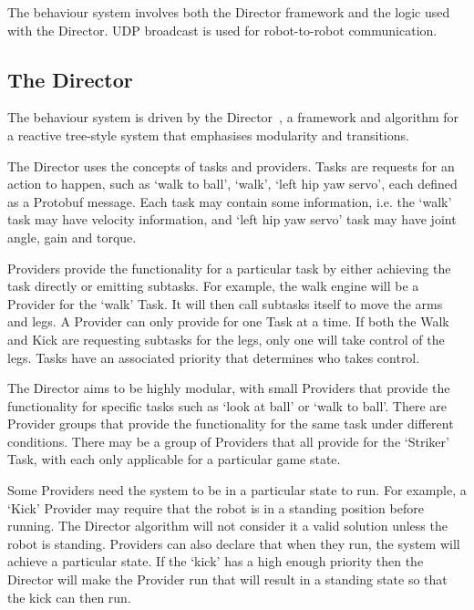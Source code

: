 \documentclass{llncs}
\begin{document}

The behaviour system involves both the Director framework and the logic used with the Director. UDP broadcast is used for robot-to-robot communication.

\subsection{The Director}

The behaviour system is driven by the Director~\cite{director2023}, a framework and algorithm for a reactive tree-style system that emphasises modularity and transitions.

The Director uses the concepts of tasks and providers. Tasks are requests for an action to happen, such as `walk to ball', `walk', `left hip yaw servo', each defined as a Protobuf message. Each task may contain some information, i.e. the `walk' task may have velocity information, and `left hip yaw servo' task may have joint angle, gain and torque. 

Providers provide the functionality for a particular task by either achieving the task directly or emitting subtasks. For example, the walk engine will be a Provider for the `walk' Task. It will then call subtasks itself to move the arms and legs. A Provider can only provide for one Task at a time. If both the Walk and Kick are requesting subtasks for the legs, only one will take control of the legs. Tasks have an associated priority that determines who takes control. 

The Director aims to be highly modular, with small Providers that provide the functionality for specific tasks such as `look at ball' or `walk to ball'. There are Provider groups that provide the functionality for the same task under different conditions. There may be a group of Providers that all provide for the `Striker' Task, with each only applicable for a particular game state.

Some Providers need the system to be in a particular state to run. For example, a `Kick' Provider may require that the robot is in a standing position before running. The Director algorithm will not consider it a valid solution unless the robot is standing. Providers can also declare that when they run, the system will achieve a particular state. If the `kick' has a high enough priority then the Director will make the Provider run that will result in a standing state so that the kick can then run.
\end{document}
